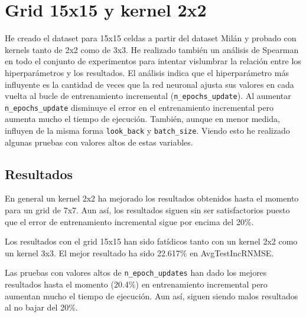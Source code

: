 \documentclass{article}
\begin{document}
\section{Grid 15x15 y kernel 2x2}
He creado el dataset para 15x15 celdas a partir del dataset Milán y probado con kernels tanto de 2x2 como de 3x3. He realizado también un análisis de Spearman en todo el conjunto de experimentos para intentar vislumbrar la relación entre los hiperparámetros y los resultados. El análisis indica que el hiperparámetro más influyente es la cantidad de veces que la red neuronal ajusta sus valores en cada vuelta al bucle de entrenamiento incremental (\texttt{n\_epochs\_update}). Al aumentar \texttt{n\_epochs\_update} disminuye el error en el entrenamiento incremental pero aumenta mucho el tiempo de ejecución. También, aunque en menor medida, influyen de la misma forma \texttt{look\_back} y \texttt{batch\_size}. Viendo esto he realizado algunas pruebas con valores altos de estas variables.

\subsection{Resultados}
En general un kernel 2x2 ha mejorado los resultados obtenidos hasta el momento para un grid de 7x7. Aun así, los resultados siguen sin ser satisfactorios puesto que el error de entrenamiento incremental sigue por encima del 20\%.

Los resultados con el grid 15x15 han sido fatídicos tanto con un kernel 2x2 como un kernel 3x3. El mejor resultado ha sido 22.617\% en AvgTestIncRNMSE.

Las pruebas con valores altos de \texttt{n\_epoch\_updates} han dado los mejores resultados hasta el momento (20.4\%) en entrenamiento incremental pero aumentan mucho el tiempo de ejecución. Aun así, siguen siendo malos resultados al no bajar del 20\%.
\end{document}
